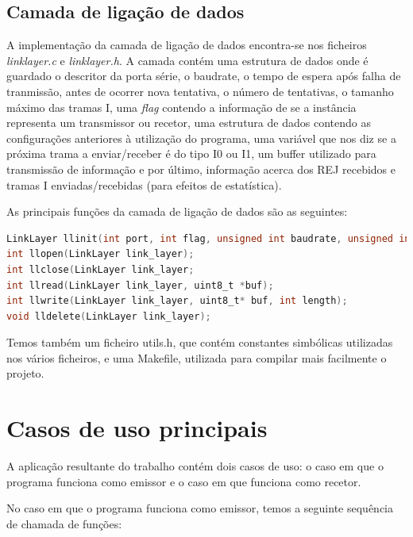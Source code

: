 \documentclass[11pt,a4paper,reqno]{article}
\numberwithin{equation}{section}
\begin{document}
\subsection{Camada de ligação de dados}

A implementação da camada de ligação de dados encontra-se nos ficheiros \textit{linklayer.c} e \textit{linklayer.h}. A camada contém uma estrutura de dados onde é guardado o descritor da porta série, o baudrate, o tempo de espera após falha de tranmissão, antes de ocorrer nova tentativa, o número de tentativas, o tamanho máximo das tramas I, uma \textit{flag} contendo a informação de se a instância representa um transmissor ou recetor, uma estrutura de dados contendo as configurações anteriores à utilização do programa, uma variável que nos diz se a próxima trama a enviar/receber é do tipo I0 ou I1, um buffer utilizado para transmissão de informação e por último, informação acerca dos REJ recebidos e tramas I enviadas/recebidas (para efeitos de estatística).



As principais funções da camada de ligação de dados são as seguintes:

\begin{lstlisting}[language=C, breaklines=true]
LinkLayer llinit(int port, int flag, unsigned int baudrate, unsigned int max_tries, unsigned int timeout, unsigned int max_frame_size);
int llopen(LinkLayer link_layer);
int llclose(LinkLayer link_layer;
int llread(LinkLayer link_layer, uint8_t *buf);
int llwrite(LinkLayer link_layer, uint8_t* buf, int length);
void lldelete(LinkLayer link_layer);
\end{lstlisting}

Temos também um ficheiro utils.h, que contém constantes simbólicas utilizadas nos vários ficheiros, e uma Makefile, utilizada para compilar mais facilmente o projeto.

\section{Casos de uso principais}

A aplicação resultante do trabalho contém dois casos de uso: o caso em que o programa funciona como emissor e o caso em que funciona como recetor. 

\vspace{5mm}

No caso em que o programa funciona como emissor, temos a seguinte sequência de chamada de funções:
\end{document}
